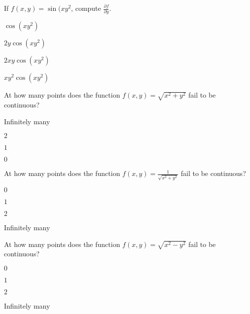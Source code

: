 \begin{readinessAssuranceTest}
\item If \(f(x,y) = \sin(xy^2\), compute \(\frac{\partial f}{\partial y}\).
\begin{multicols}{4}
\begin{readinessAssuranceTestChoices}
\item \(\cos(xy^2)\) 
\item \(2y\cos(xy^2)\) 
\item \(2xy\cos(xy^2)\)  %
\item \(xy^2\cos(xy^2)\) 
\end{readinessAssuranceTestChoices}
\end{multicols}

\item At how many points does the function \(f(x,y)=\sqrt{x^2+y^2}\) fail to be continuous?
\begin{multicols}{4}
\begin{readinessAssuranceTestChoices}
\item Infinitely many
\item \(2\) 
\item \(1\)  
\item \(0\) %
\end{readinessAssuranceTestChoices}
\end{multicols}


\item At how many points does the function \(f(x,y)=\frac{1}{\sqrt{x^2+y^2}}\) fail to be continuous?
\begin{multicols}{4}
\begin{readinessAssuranceTestChoices}
\item \(0\) 
\item \(1\) %
\item \(2\) 
\item Infinitely many
\end{readinessAssuranceTestChoices}
\end{multicols}

\item At how many points does the function \(f(x,y)=\sqrt{x^2-y^2}\) fail to be continuous?
\begin{multicols}{4}
\begin{readinessAssuranceTestChoices}
\item \(0\) 
\item \(1\) 
\item \(2\) 
\item Infinitely many %
\end{readinessAssuranceTestChoices}
\end{multicols}


\end{readinessAssuranceTest}
